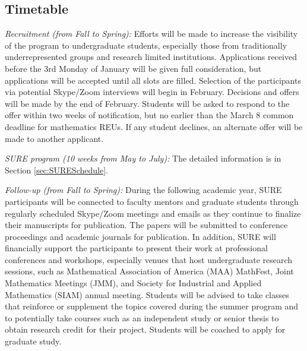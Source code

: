 \documentclass[11pt]{NSFamsart}
\begin{document}
\subsection{Timetable}
\emph{Recruitment (from Fall to Spring):} Efforts will be made to increase the visibility of the program to undergraduate students, especially those from traditionally underrepresented groups and research limited institutions. Applications received before the 3rd Monday of January will be given full consideration, but applications will be accepted until all slots are filled. Selection of the participants via potential Skype/Zoom interviews will begin in February. Decisions and offers will be made by the end of February. Students will be asked to respond to the offer within two weeks of notification, but no earlier than the March 8 common deadline for mathematics REUs. If any student declines, an alternate offer will be made to another applicant. 
 
\noindent\emph{SURE program (10 weeks from
May to July):} 
The detailed
information is in Section \ref{sec:SURESchedule}.

\noindent\emph{Follow-up (from Fall to Spring):} During the following academic year, SURE participants will be connected to faculty mentors and graduate students through regularly scheduled Skype/Zoom meetings and emails as they continue to finalize their manuscripts for publication. The papers will be submitted to conference proceedings and academic journals for publication. In addition, SURE will financially support the participants to present their work at professional conferences and workshops, especially venues that host undergraduate research sessions, such as Mathematical Association of America (MAA) MathFest, Joint Mathematics Meetings (JMM), and Society for Industrial and Applied Mathematics (SIAM) annual meeting. Students will be advised to take classes that reinforce or supplement the topics covered during the summer program and to potentially take courses such as an independent study or senior thesis to obtain research credit for their project. Students will be coached to apply for graduate study.
\end{document}
